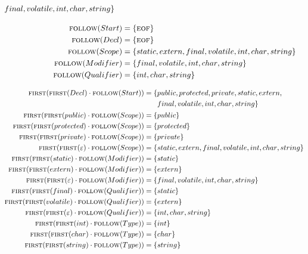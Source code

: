 \documentclass{report}
\newcommand{\Null}{\varepsilon}
\newcommand{\Seq}{\cdot}
\newcommand{\FIRST}{\textsc{first}}
\newcommand{\FOLLOW}{\textsc{follow}}
\newcommand{\EOF}{\textsc{eof}}
\newcommand{\NT}[1]{{#1}}
\newcommand{\T}[1]{{#1}}
\begin{document}
\begin{equation*}
\begin{aligned}
\begin{aligned}[t]
    &\T{final}, \T{volatile}, \T{int}, \T{char}, \T{string}\}\end{aligned}\\[1em]
    \FOLLOW(\NT{Start}) &= \{\EOF\}\\
    \FOLLOW(\NT{Decl}) &= \{\EOF\}\\
    \FOLLOW(\NT{Scope}) &= \{\T{static}, \T{extern}, \T{final}, \T{volatile}, \T{int}, \T{char}, \T{string}\}\\
    \FOLLOW(\NT{Modifier}) &= \{\T{final}, \T{volatile}, \T{int}, \T{char}, \T{string}\}\\
    \FOLLOW(\NT{Qualifier}) &= \{\T{int}, \T{char}, \T{string}\}\\
  \end{aligned}
\end{equation*}

\begin{equation*}
  \begin{aligned}
    \FIRST(\FIRST(\NT{Decl}) \Seq \FOLLOW(\NT{Start})) &= \begin{aligned}[t]\{&\T{public}, \T{protected}, \T{private}, \T{static}, \T{extern},\\
    &\T{final}, \T{volatile}, \T{int}, \T{char}, \T{string}\}\end{aligned}\\
    \FIRST(\FIRST(\T{public}) \Seq \FOLLOW(\NT{Scope})) &= \{\T{public}\}\\
    \FIRST(\FIRST(\T{protected}) \Seq \FOLLOW(\NT{Scope})) &= \{\T{protected}\}\\
    \FIRST(\FIRST(\T{private}) \Seq \FOLLOW(\NT{Scope})) &= \{\T{private}\}\\
    \FIRST(\FIRST(\Null) \Seq \FOLLOW(\NT{Scope})) &= \{\T{static}, \T{extern}, \T{final}, \T{volatile}, \T{int}, \T{char}, \T{string}\}\\
    \FIRST(\FIRST(\T{static}) \Seq \FOLLOW(\NT{Modifier})) &= \{\T{static}\}\\
    \FIRST(\FIRST(\T{extern}) \Seq \FOLLOW(\NT{Modifier})) &= \{\T{extern}\}\\
    \FIRST(\FIRST(\Null) \Seq \FOLLOW(\NT{Modifier})) &= \{\T{final}, \T{volatile}, \T{int}, \T{char}, \T{string}\}\\
    \FIRST(\FIRST(\T{final}) \Seq \FOLLOW(\NT{Qualifier})) &= \{\T{static}\}\\
    \FIRST(\FIRST(\T{volatile}) \Seq \FOLLOW(\NT{Qualifier})) &= \{\T{extern}\}\\
    \FIRST(\FIRST(\Null) \Seq \FOLLOW(\NT{Qualifier})) &= \{\T{int}, \T{char}, \T{string}\}\\
    \FIRST(\FIRST(\T{int}) \Seq \FOLLOW(\NT{Type})) &= \{\T{int}\}\\
    \FIRST(\FIRST(\T{char}) \Seq \FOLLOW(\NT{Type})) &= \{\T{char}\}\\
    \FIRST(\FIRST(\T{string}) \Seq \FOLLOW(\NT{Type})) &= \{\T{string}\}\\
  \end{aligned}
\end{equation*}
\end{document}
